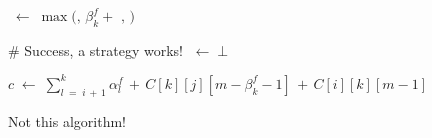 \begin{algorithm}[htbp]
{{{{                    \Peak \(\;\leftarrow\; \max( \)\PeakFs\(,\, \beta^f_k + \) \PeakR\(,\,\)\PeakL\( ) \)\;
                    \BlankLine

                    \BlankLine

                    \# Success, a strategy works!\;
                    \Failed\(\;\leftarrow\; \bot\)\;
                    \BlankLine

                    \(c \;\leftarrow\; \sum_{l\;=\;i\,+\,1}^k \alpha^f_l \,+\, C[k][j][m-\beta^f_k-1] \,+\, C[i][k][m-1]\)\;
                    \BlankLine

                }
            }
        }
    }
    
    \caption{Not this algorithm!}
    \label{alg:3-policy-solver-final}
\end{algorithm}
